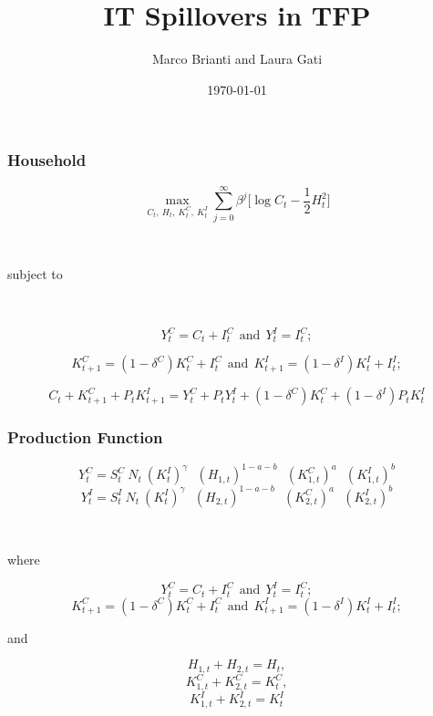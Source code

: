 \documentclass{beamer}
\author[Brianti, Gati]{Marco Brianti and Laura Gati}
\institute[Boston College]{Boston College}
\title{IT Spillovers in TFP }
\date{\today}
\begin{document}
\begin{frame}

\maketitle


\end{frame}

\begin{frame}
\frametitle{Household}

$$
\max_{C_t, \ H_t, \ K_t^C, \ K_t^I} \sum_{j=0}^{\infty} \beta^j \bigg[ \log C_t -  \frac{1}{2} H_t^2 \bigg]
$$

\

subject to

\


$$
Y^C_t = C_t + I^C_t \ \ \text{and} \ \ Y_t^I = I^C_t;
$$


$$
K^C_{t+1} = (1 - \delta^C)K^C_t + I^C_t \ \ \text{and} \ \ K^I_{t+1} = (1 - \delta^I)K^I_t + I^I_t;
$$


$$
C_t + K^C_{t+1} + P_t K^I_{t+1} = Y^C_t + P_t Y^I_t + (1 - \delta^C)K^C_t + (1 - \delta^I)P_t K^I_t
$$


\end{frame}

\begin{frame}
\frametitle{Production Function}

$$
Y^C_t = S_t^C \  N_t \ (K^I_t)^{\gamma} \ \ \  (H_{1,t})^{1-a-b} \ \ \  (K_{1,t}^C)^{a} \ \ \ (K_{1,t}^I)^{b}
$$
$$
Y^I_t = S_t^I \  N_t \ (K^I_t)^{\gamma} \ \ \  (H_{2,t})^{1-a-b} \ \ \  (K_{2,t}^C)^{a} \ \ \ (K_{2,t}^I)^{b}
$$

\


where

$$
Y^C_t = C_t + I^C_t \ \ \text{and} \ \ Y_t^I = I^C_t;
$$
$$
K^C_{t+1} = (1 - \delta^C)K^C_t + I^C_t \ \ \text{and} \ \ K^I_{t+1} = (1 - \delta^I)K^I_t + I^I_t;
$$

and


$$
H_{1,t} + H_{2,t} = H_t, 
$$
$$
K_{1,t}^C + K_{2,t}^C = K_t^C, 
$$
$$
K_{1,t}^I + K_{2,t}^I = K_t^I
$$





\end{frame}
\end{document}
